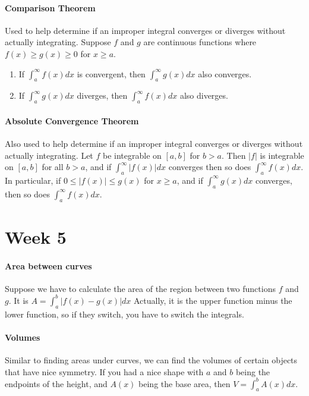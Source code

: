 \documentclass[10pt,letter]{article}
\begin{document}
\paragraph{Comparison Theorem} Used to help determine if an improper integral converges or diverges without actually integrating. Suppose $f$ and $g$ are continuous functions where $f(x)\geq g(x)\geq0$ for $x\geq a$. \begin{enumerate}
    \item If $\int_a^\infty f(x)dx$ is convergent, then $\int_a^\infty g(x)dx$ also converges.
    \item If $\int_a^\infty g(x)dx$ diverges, then $\int_a^\infty f(x)dx$ also diverges. 
\end{enumerate}

\paragraph{Absolute Convergence Theorem} Also used to help determine if an improper integral converges or diverges without actually integrating. Let $f$ be integrable on $[a,b]$ for $b>a$. Then $|f|$ is integrable on $[a,b]$ for all $b>a$, and if $\int_a^\infty |f(x)|dx$ converges then so does $\int_a^\infty f(x)dx$. In particular, if $0\leq|f(x)|\leq g(x)$ for $x\geq a$, and if $\int_a^\infty g(x)dx$ converges, then so does $\int_a^\infty f(x)dx$. 

\pagebreak

\section*{Week 5}
\paragraph{Area between curves} Suppose we have to calculate the area of the region between two functions $f$ and $g$. It is $A=\int_a^b|f(x)-g(x)|dx$ Actually, it is the upper function minus the lower function, so if they switch, you have to switch the integrals. 

\paragraph{Volumes} Similar to finding areas under curves, we can find the volumes of certain objects that have nice symmetry. If you had a nice shape with $a$ and $b$ being the endpoints of the height, and $A(x)$ being the base area, then $V=\int_a^b A(x)dx$. 
\end{document}

